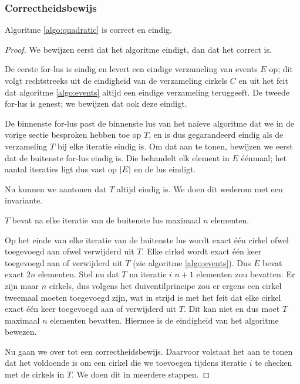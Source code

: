 \subsubsection{Correctheidsbewijs}
\begin{stl} Algoritme \ref{algo:quadratic} is correct en eindig.\end{stl}
\begin{proof}
We bewijzen eerst dat het algoritme eindigt, dan dat het correct
is. 

De eerste for-lus is eindig en levert een eindige verzameling van
events $E$ op; dit volgt rechtstreeks uit de eindigheid van de
verzameling cirkels $C$ en uit het feit dat algoritme
\ref{algo:events} altijd een eindige verzameling teruggeeft. De tweede
for-lus is genest; we bewijzen dat ook deze eindigt.

De binnenste for-lus past de binnenste lus van het na\"ieve algoritme
dat we in de vorige sectie besproken hebben toe op $T$, en is dus
gegarandeerd eindig als de verzameling $T$ bij elke iteratie eindig
is. Om dat aan te tonen, bewijzen we eerst dat de buitenste for-lus
eindig is.  Die behandelt elk element in $E$ \'e\'enmaal; het aantal
iteraties ligt dus vast op $\left|E\right|$ en de lus eindigt.

Nu kunnen we aantonen dat $T$ altijd eindig is. We doen dit wederom
met een invariante.

\begin{inv}
$T$ bevat na elke iteratie van de buitenste lus maximaal $n$ elementen.
\end{inv}

Op het einde van elke iteratie van de buitenste lus wordt exact
\'e\'en cirkel ofwel toegevoegd aan ofwel verwijderd uit $T$. Elke
cirkel wordt exact \'e\'en keer toegevoegd aan of verwijderd uit $T$
(zie algoritme \ref{algo:events}). Dus $E$ bevat exact $2n$
elementen. Stel nu dat $T$ na iteratie $i$ $n + 1$ elementen zou
bevatten. Er zijn maar $n$ cirkels, dus volgens het duiventilprincipe
zou er ergens een cirkel tweemaal moeten toegevoegd zijn, wat in
strijd is met het feit dat elke cirkel exact \'e\'en keer
toegevoegd aan of verwijderd uit $T$. Dit kan niet en dus moet $T$
maximaal $n$ elementen bevatten. Hiermee is de eindigheid van het
algoritme bewezen.

Nu gaan we over tot een correctheidsbewijs. Daarvoor volstaat het aan
te tonen dat het voldoende is om een cirkel die we toevoegen tijdens
iteratie $i$ te checken met de cirkels in $T$. We doen dit in meerdere stappen.


\end{proof}
